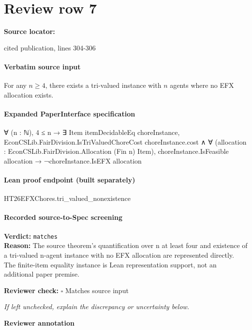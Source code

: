 \documentclass[10pt]{article}
\newcommand{\reviewerbox}{%
  \par\noindent\fbox{\parbox{0.96\linewidth}{\rule{0pt}{0.38in}}}\par
}
\newcommand{\reviewmatch}[1]{%
  \par\noindent\textbf{Reviewer check:} $\square$\; #1\par
  \noindent\emph{If left unchecked, explain the discrepancy or uncertainty below.}\par
}
\begin{document}
\section*{Review row 7}
\textbf{Source locator:} {\footnotesize\raggedright cited publication, lines 304-\allowbreak{}306\par}
\paragraph{Verbatim source input}
\begin{ReviewVerbatim}
\begin{theorem}\label{thm:tri}
    For any $n\geq 4$, there exists a tri-valued instance with $n$ agents where no EFX allocation exists.
\end{theorem}
\end{ReviewVerbatim}


\paragraph{Expanded PaperInterface specification}
\begin{ReviewVerbatim}
∀ (n : ℕ),
  4 ≤ n →
    ∃ Item itemDecidableEq choreInstance,
      EconCSLib.FairDivision.IsTriValuedChoreCost choreInstance.cost ∧
        ∀ (allocation : EconCSLib.FairDivision.Allocation (Fin n) Item),
          choreInstance.IsFeasible allocation → ¬choreInstance.IsEFX allocation
\end{ReviewVerbatim}

\paragraph{Lean proof endpoint (built separately)}\begin{ReviewVerbatim}
HT26EFXChores.tri_valued_nonexistence
\end{ReviewVerbatim}

\paragraph{Recorded source-to-Spec screening}
\textbf{Verdict:} \texttt{matches}
\\
\textbf{Reason:} The source theorem's quantification over n at least four and existence of a tri-valued n-agent instance with no EFX allocation are represented directly. The finite-item equality instance is Lean representation support, not an additional paper premise.
\reviewmatch{Matches source input}
\noindent\textbf{Reviewer annotation}\par
\reviewerbox
\clearpage
\hypertarget{source-claim-2321d8010acce683}{}
\end{document}
